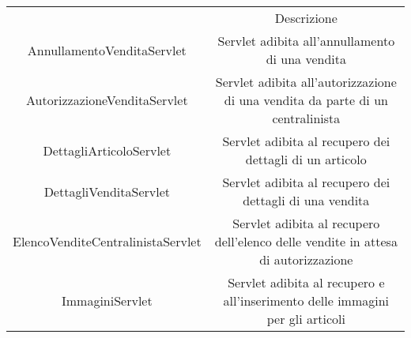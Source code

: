 \documentclass[12pt,a4paper]{article}
\begin{document}
\begin{center}
\begin{tabular}{|c|c|}
\hline
\rowcolor[HTML]{C0C0C0} 
\multicolumn{2}{|c|}{\cellcolor[HTML]{C0C0C0}Vendita} \\ \hline
\rowcolor[HTML]{C0C0C0}  \multicolumn{1}{|c|}{\cellcolor[HTML]{C0C0C0}Classe}  &  Descrizione \\ \hline

AnnullamentoVenditaServlet & \begin{minipage}{10cm} \vspace{5pt}
Servlet adibita all'annullamento di una vendita \vspace{5pt}
\end{minipage} \\ \hline

AutorizzazioneVenditaServlet & \begin{minipage}{10cm} \vspace{5pt}
Servlet adibita all'autorizzazione di una vendita da parte di un centralinista \vspace{5pt}
\end{minipage} \\ \hline

DettagliArticoloServlet & \begin{minipage}{10cm} \vspace{5pt}
Servlet adibita al recupero dei dettagli di un articolo \vspace{5pt}
\end{minipage} \\ \hline

DettagliVenditaServlet & \begin{minipage}{10cm} \vspace{5pt}
Servlet adibita al recupero dei dettagli di una vendita \vspace{5pt}
\end{minipage} \\ \hline

ElencoVenditeCentralinistaServlet & \begin{minipage}{10cm} \vspace{5pt}
Servlet adibita al recupero dell'elenco delle vendite in attesa di autorizzazione \vspace{5pt}
\end{minipage} \\ \hline

ImmaginiServlet & \begin{minipage}{10cm} \vspace{5pt}
Servlet adibita al recupero e all'inserimento delle immagini per gli articoli  \vspace{5pt}
\end{minipage} \\ \hline


\end{tabular}
\end{center}
\end{document}
